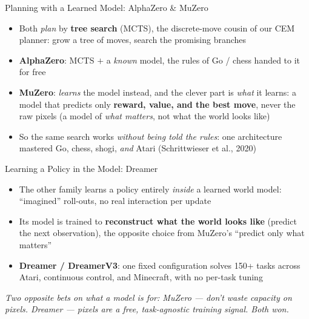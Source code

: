 \begin{frame}{Planning with a Learned Model: AlphaZero \& MuZero}
\begin{itemize}
    \item Both \emph{plan} by \textbf{tree search} (MCTS), the discrete-move
          cousin of our CEM planner: grow a tree of moves, search the promising
          branches
    \item \textbf{AlphaZero}: MCTS $+$ a \emph{known} model, the rules of
          Go / chess handed to it for free
    \item \textbf{MuZero}: \emph{learns} the model instead, and the clever part is
          \emph{what} it learns: a model that predicts only \textbf{reward,
          value, and the best move}, never the raw pixels (a model of \emph{what
          matters}, not what the world looks like)
    \item So the same search works \emph{without being told the rules}: one
          architecture mastered Go, chess, shogi, \emph{and} Atari
          (Schrittwieser et al., 2020)
\end{itemize}
\end{frame}

\begin{frame}{Learning a Policy in the Model: Dreamer}
\begin{itemize}
    \item The other family learns a policy entirely \emph{inside} a learned world
          model: ``imagined'' roll-outs, no real interaction per update
    \item Its model is trained to \textbf{reconstruct what the world looks like}
          (predict the next observation), the opposite choice from MuZero's
          ``predict only what matters''
    \item \textbf{Dreamer / DreamerV3}: one fixed configuration solves 150+ tasks
          across Atari, continuous control, and Minecraft, with no per-task tuning
\end{itemize}
\vspace{0.3em}
\begin{center}
\emph{Two opposite bets on what a model is \emph{for}: MuZero --- don't waste
capacity on pixels. Dreamer --- pixels are a free, task-agnostic training
signal. Both won.}
\end{center}
\end{frame}
